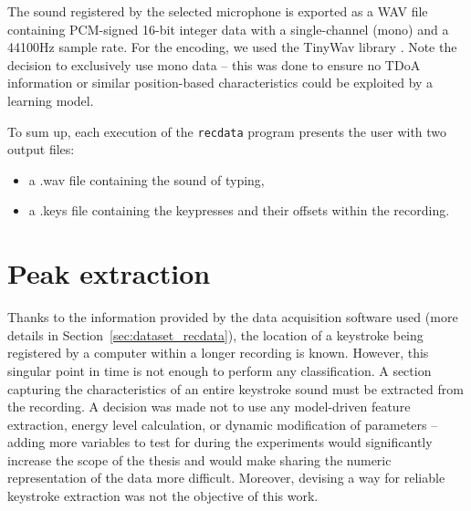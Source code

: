 \documentclass[../main.tex]{subfiles}
\begin{document}
The sound registered by the selected microphone is exported as a WAV file containing PCM-signed 16-bit integer
data with a single-channel (mono) and a 44100Hz sample rate. For the encoding, we used the TinyWav library
\cite{TinyWav}. Note the decision to exclusively use mono data -- this was done to ensure no TDoA information or similar position-based characteristics could be exploited by a learning model.

To sum up, each execution of the \texttt{recdata} program presents the user with two output files:
\begin{itemize}
    \item a .wav file containing the sound of typing,
    \item a .keys file containing the keypresses and their offsets within the recording.
\end{itemize}

\section{Peak extraction}
\label{sec:dataset_peak_extraction}
Thanks to the information provided by the data acquisition software used (more details in Section~\ref{sec:dataset_recdata}), the location of a keystroke being registered by a computer within a longer recording is known.
However, this singular point in time is not enough to perform any classification. A section capturing
the characteristics of an entire keystroke sound must be extracted from the recording. A decision was made not to use
any model-driven feature extraction, energy level calculation, or dynamic modification of parameters -- adding
more variables to test for during the experiments would significantly increase the scope of the thesis and
would make sharing the numeric representation of the data more difficult. Moreover, devising a way for reliable keystroke extraction was not the objective of this work.
\end{document}
